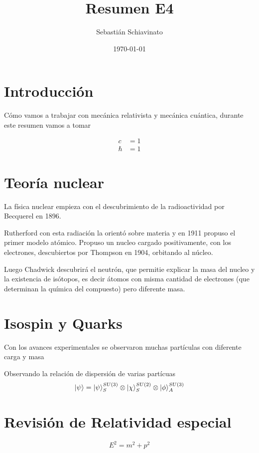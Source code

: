 \documentclass[a4paper]{article}
\title{Resumen E4}
\author{ Sebastián Schiavinato}
\date{\today}
\begin{document}
\maketitle

\tableofcontents

\section{Introducción}\label{ sec:introduccion}

Cómo vamos a trabajar con mecánica relativista y mecánica cuántica, durante este resumen vamos a tomar


\noindent\noindent\[
\begin{aligned}
c &= 1\\
\hbar &= 1
\end{aligned}
\]


\section{Teoría nuclear}\label{sec:nuclear}
La física nuclear empieza con el descubrimiento de la radioactividad por Becquerel en 1896. 

Rutherford con esta radiación la orientó sobre materia y en 1911 propuso el primer modelo atómico. Propuso un nucleo cargado positivamente, con los electrones, descubiertos por Thompson en 1904, orbitando al núcleo. 

Luego Chadwick descubrirá el neutrón, que permitie explicar la masa del nucleo y la existencia de isótopos, es decir átomos con misma cantidad de electrones (que determinan la química del compuesto) pero diferente masa.


\section{Isospin y Quarks}\label{sec:isospin-y-quarks}
Con los avances experimentales se observaron muchas partículas con diferente carga y masa

Observando la relación de dispersión de varias partícuas 
\[ \ket{\psi} = \ket{\psi}_S^{SU(3)} \otimes \ket{\chi}_S^{SU(2)} \otimes \ket{\phi}_A^{SU(3)} \]

\section{Revisión de Relatividad especial}\label{sec:relatividad-especial}

\begin{equation}
E^2 = m^2 + p^2
\label{eq:energy_momentum_relativistic}
\end{equation}
\end{document}
